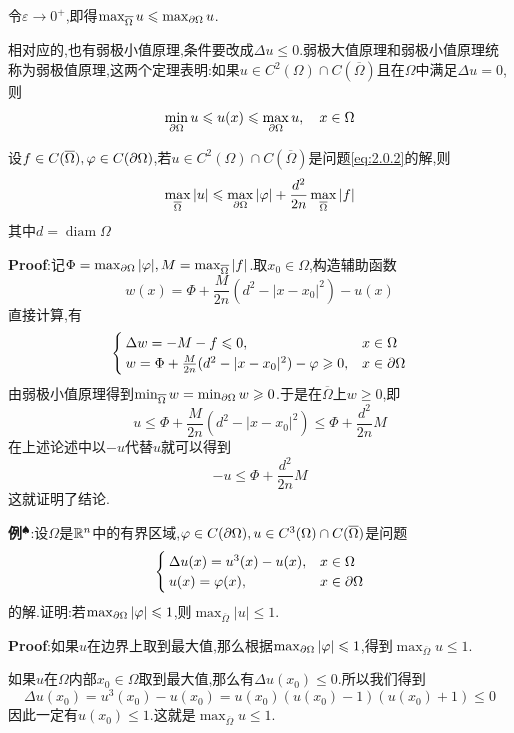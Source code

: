 令$\varepsilon\to 0^+$,即得$\max_{\overline{\Omega}}u\leqslant\max_{\partial\Omega}u$.\par
相对应的,也有弱极小值原理,条件要改成$\Delta u\leqslant 0$.弱极大值原理和弱极小值原理统称为弱极值原理,这两个定理表明:如果$u\in C^2(\Omega)\cap C(\overline{\Omega})$且在$\Omega$中满足$\Delta u=0$,则
$$
\min_{\partial\Omega}u\leqslant u(x)\leqslant \max_{\partial\Omega}u,\quad x\in\Omega
$$
\begin{tcolorbox}[colback=KuangNei,colframe=BianKuang,title=\textbf{最大模估计},sharpish corners]
    设$f\in C(\overline{\Omega}),\varphi\in C(\partial\Omega)$,若$u\in C^2(\Omega)\cap C(\overline{\Omega})$是问题\eqref{eq:2.0.2}的解,则
    $$
    \max_{\overline{\Omega}}|u|\leqslant\max_{\partial\Omega}|\varphi|+\frac{d^2}{2n}\max_{\overline{\Omega}}|f|
    $$
    其中$d=\operatorname{diam}\Omega$
\end{tcolorbox}
\textbf{Proof}:记$\Phi=\max_{\partial\Omega}|\varphi|,M=\max_{\overline{\Omega}}|f|$.取$x_0\in\Omega$,构造辅助函数
$$
w(x)=\Phi+\frac{M}{2n}(d^2-|x-x_0|^2)-u(x)
$$
直接计算,有
$$
\begin{cases}
    \Delta w=-M-f\leqslant 0,&x\in\Omega\\
    w=\Phi+\frac{M}{2n}(d^2-|x-x_0|^2)-\varphi\geqslant 0,&x\in\partial\Omega
\end{cases}
$$
由弱极小值原理得到$\min_{\overline{\Omega}}w=\min_{\partial\Omega}w\geqslant 0$.于是在$\overline{\Omega}$上$w\geqslant 0$,即
$$
u\leqslant \Phi+\frac{M}{2n}(d^2-|x-x_0|^2)\leqslant\Phi+\frac{d^2}{2n}M 
$$
在上述论述中以$-u$代替$u$就可以得到
$$
-u\leqslant\Phi+\frac{d^2}{2n}M 
$$
这就证明了结论.\par
\textbf{例}$^\spadesuit$:设$\Omega$是$\mathbb{R}^n$中的有界区域,$\varphi\in C(\partial\Omega),u\in C^3(\Omega)\cap C(\overline{\Omega})$是问题
$$
\begin{cases}
    \Delta u(x)=u^3(x)-u(x),&x\in\Omega\\
    u(x)=\varphi(x),&x\in\partial\Omega
\end{cases}
$$
的解.证明:若$\max_{\partial\Omega}|\varphi|\leqslant 1$,则$\max_{\overline{\Omega}}|u|\leqslant 1$.\par
\textbf{Proof}:如果$u$在边界上取到最大值,那么根据$\max_{\partial\Omega}|\varphi|\leqslant 1$,得到$\max_{\overline{\Omega}}u\leqslant 1$.\par
如果$u$在$\Omega$内部$x_0\in\Omega$取到最大值,那么有$\Delta u(x_0)\leqslant 0$.所以我们得到
$$
\Delta u(x_0)=u^3(x_0)-u(x_0)=u(x_0)(u(x_0)-1)(u(x_0)+1)\leqslant 0
$$
因此一定有$u(x_0)\leqslant 1$.这就是$\max_{\overline{\Omega}}u\leqslant 1$.\par
